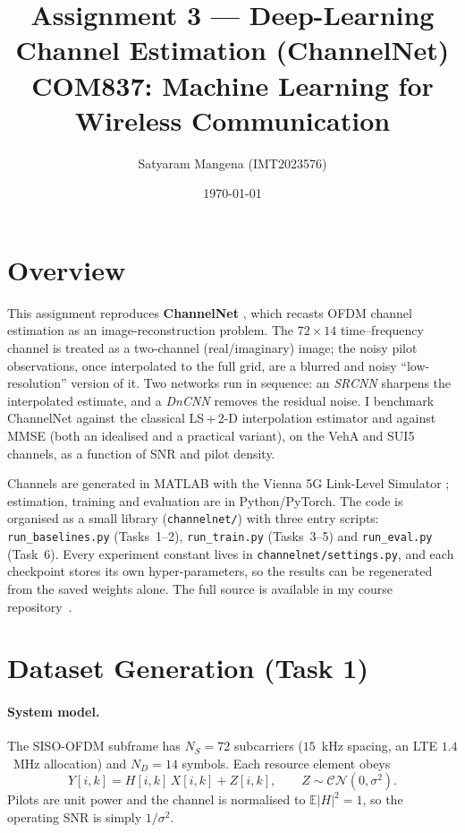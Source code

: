 \documentclass[a4paper,10pt]{article}
\title{\vspace{-1.6cm}\textbf{\Large Assignment 3 --- Deep-Learning Channel Estimation (ChannelNet)}\\[2pt]
\normalsize COM837: Machine Learning for Wireless Communication}
\author{\normalsize Satyaram Mangena (IMT2023576)}
\date{\vspace{-0.4cm}\small\today}
\begin{document}
\maketitle
\vspace{-0.7cm}

\section{Overview}
This assignment reproduces \textbf{ChannelNet} \cite{soltani2019}, which recasts
OFDM channel estimation as an image-reconstruction problem. The $72\times14$
time--frequency channel is treated as a two-channel (real/imaginary) image; the
noisy pilot observations, once interpolated to the full grid, are a blurred and
noisy ``low-resolution'' version of it. Two networks run in sequence: an
\emph{SRCNN} \cite{dong2016} sharpens the interpolated estimate, and a
\emph{DnCNN} \cite{zhang2017} removes the residual noise. I benchmark ChannelNet
against the classical LS\,+\,2-D interpolation estimator and against MMSE (both
an idealised and a practical variant), on the VehA and SUI5 channels, as a
function of SNR and pilot density.

Channels are generated in MATLAB with the Vienna 5G Link-Level Simulator
\cite{vienna}; estimation, training and evaluation are in Python/PyTorch. The
code is organised as a small library (\texttt{channelnet/}) with three entry
scripts: \texttt{run\_baselines.py} (Tasks~1--2), \texttt{run\_train.py}
(Tasks~3--5) and \texttt{run\_eval.py} (Task~6). Every experiment constant lives
in \texttt{channelnet/settings.py}, and each checkpoint stores its own
hyper-parameters, so the results can be regenerated from the saved weights
alone. The full source is available in my course repository~\cite{github}.

\section{Dataset Generation (Task 1)}
\paragraph{System model.} The SISO-OFDM subframe has $N_S=72$ subcarriers
($15$~kHz spacing, an LTE $1.4$~MHz allocation) and $N_D=14$ symbols. Each
resource element obeys
\begin{equation}
Y[i,k]=H[i,k]\,X[i,k]+Z[i,k],\qquad Z\sim\mathcal{CN}(0,\sigma^2).
\label{eq:model}
\end{equation}
Pilots are unit power and the channel is normalised to $\mathbb{E}|H|^2=1$, so
the operating SNR is simply $1/\sigma^2$.
\end{document}
